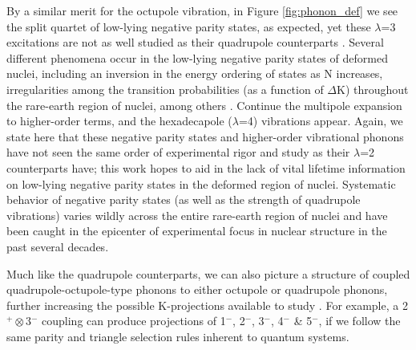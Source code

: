 By a similar merit for the octupole vibration, in Figure \ref{fig:phonon_def} we see the split quartet of low-lying negative parity states, as expected, yet these $\lambda$=3 excitations are not as well studied as their quadrupole counterparts \cite{Casten_text}. Several different phenomena occur in the low-lying negative parity states of deformed nuclei, including an inversion in the energy ordering of states as N increases, irregularities among the transition probabilities (as a function of $\Delta$K) throughout the rare-earth region of nuclei, among others \cite{Borner_collective1999,Casten_text}. Continue the multipole expansion to higher-order terms, and the hexadecapole ($\lambda$=4) vibrations appear. Again, we state here that these negative parity states and higher-order vibrational phonons have not seen the same order of experimental rigor and study as their $\lambda$=2 counterparts have; this work hopes to aid in the lack of vital lifetime information on low-lying negative parity states in the deformed region of nuclei. Systematic behavior of negative parity states (as well as the strength of quadrupole vibrations) varies wildly across the entire rare-earth region of nuclei and have been caught in the epicenter of experimental focus in nuclear structure in the past several decades. 

Much like the quadrupole counterparts, we can also picture a structure of coupled quadrupole-octupole-type phonons to either octupole or quadrupole phonons, further increasing the possible K-projections available to study \cite{Pascu_octupole_2015}. For example, a 2$^+\otimes$3$^-$ coupling can produce projections of 1$^-$, 2$^-$, 3$^-$, 4$^-$ \& 5$^-$, if we follow the same parity and triangle selection rules inherent to quantum systems. 






